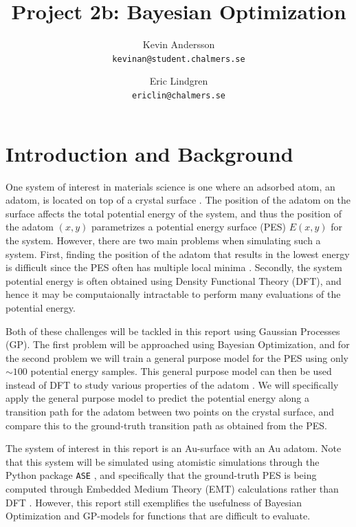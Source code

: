 \documentclass[11pt,a4paper]{article}
\title{Project 2b: Bayesian Optimization}
\author{
  Kevin Andersson\\
  \texttt{kevinan@student.chalmers.se}
  \and
   Eric Lindgren\\
  \texttt{ericlin@chalmers.se}
}
\begin{document}
\maketitle

{}%
\setcounter{page}{1}
\section{Introduction and Background}

One system of interest in materials science is one where an adsorbed atom, an adatom, is located on top of a crystal surface \cite{wiki_adatom}. The position of the adatom on the surface affects the total potential energy of the system, and thus the position of the adatom $(x,y)$ parametrizes a potential energy surface (PES) $E(x,y)$ for the system. However, there are two main problems when simulating such a system. First, finding the position of the adatom that results in the lowest energy is difficult since the PES often has multiple local minima \cite{project_pm}. Secondly, the system potential energy is often obtained using Density Functional Theory (DFT), and hence it may be computaionally intractable to perform many evaluations of the potential energy.

Both of these challenges will be tackled in this report using Gaussian Processes (GP). The first problem will be approached using Bayesian Optimization, and for the second problem we will train a general purpose model for the PES using only $\sim 100$ potential energy samples. This general purpose model can then be used instead of DFT to study various properties of the adatom \cite{project_pm}. We will specifically apply the general purpose model to predict the potential energy along a transition path for the adatom between two points on the crystal surface, and compare this to the ground-truth transition path as obtained from the PES.

The system of interest in this report is an Au-surface with an Au adatom. Note that this system will be simulated using atomistic simulations through the Python package \texttt{ASE} \cite{ASE}, and specifically that the ground-truth PES is being computed through Embedded Medium Theory (EMT) calculations rather than DFT \cite{project_pm}. However, this report still exemplifies the usefulness of Bayesian Optimization and GP-models for functions that are difficult to evaluate.
\end{document}
